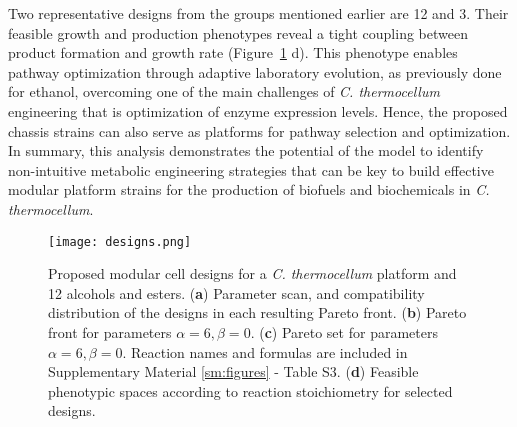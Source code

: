 Two representative designs from the groups mentioned earlier are 12 and 3.
Their feasible growth and production phenotypes reveal a tight coupling between product formation and growth rate (Figure~\ref{fig6:designs} d).
This phenotype enables pathway optimization through adaptive laboratory evolution, as previously done for ethanol,\citep{tian2016} overcoming one of the main challenges of \textit{C. thermocellum} engineering that is optimization of enzyme expression levels. Hence, the proposed chassis strains can also serve as platforms for pathway selection and optimization.
In summary, this analysis demonstrates the potential of the model to identify non-intuitive metabolic engineering strategies that can be key to build effective modular platform strains for the production of biofuels and biochemicals in \textit{C. thermocellum}.

\begin{figure}[hp]
    \centering
    \texttt{[image: designs.png]}
    \caption[Proposed modular cell designs for a \protect\textit{C. thermocellum} platform and 12 alcohols and esters]{Proposed modular cell designs for a \protect\textit{C. thermocellum} platform and 12 alcohols and esters. (\textbf{a}) Parameter scan, and compatibility distribution of the designs in each resulting Pareto front. (\textbf{b}) Pareto front for parameters $\alpha=6,\beta=0$. (\textbf{c}) Pareto set for parameters $\alpha=6,\beta=0$. Reaction names and formulas are included in Supplementary Material \ref{sm:figures} - Table S3. (\textbf{d}) Feasible phenotypic spaces according to reaction stoichiometry for selected designs.}
   \label{fig6:designs}
\end{figure}

